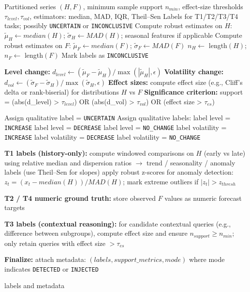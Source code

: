 \bigskip

\begin{algorithm}[H]
\caption{Rule-based Ground-Truth Labeling}
\label{alg:label_gen}
\begin{algorithmic}[1]
\REQUIRE Partitioned series $(H, F)$, minimum sample support $n_{min}$, effect-size thresholds $\tau_{level}, \tau_{vol}$, estimators: median, MAD, IQR, Theil--Sen
\ENSURE Labels for T1/T2/T3/T4 tasks; possibly \texttt{UNCERTAIN} or \texttt{INCONCLUSIVE}
\STATE Compute robust estimates on $H$: $\tilde{\mu}_H \leftarrow median(H)$; $\tilde{\sigma}_H \leftarrow MAD(H)$; seasonal features if applicable
\STATE Compute robust estimates on $F$: $\tilde{\mu}_F \leftarrow median(F)$; $\tilde{\sigma}_F \leftarrow MAD(F)$
\STATE $n_H \leftarrow$ length$(H)$; $n_F \leftarrow$ length$(F)$
    \STATE Mark labels as \texttt{INCONCLUSIVE}
    \RETURN
\ENDIF

\STATE \textbf{Level change:} $d_{level} \leftarrow (\tilde{\mu}_F - \tilde{\mu}_H)/\max(|\tilde{\mu}_H|, \epsilon)$
\STATE \textbf{Volatility change:} $d_{vol} \leftarrow (\tilde{\sigma}_F - \tilde{\sigma}_H)/\max(\tilde{\sigma}_H, \epsilon)$
\STATE \textbf{Effect sizes:} compute effect size (e.g., Cliff's delta or rank-biserial) for distributions $H$ vs $F$
\STATE \textbf{Significance criterion:} support = (abs(d_{level}) > $\tau_{level}$) OR (abs(d_{vol}) > $\tau_{vol}$) OR (effect size > $\tau_{es}$)

    \STATE Assign qualitative label = \texttt{UNCERTAIN}
\ELSE
    \STATE Assign qualitative labels:
     label level = \texttt{INCREASE}
     label level = \texttt{DECREASE}
    \ELSE label level = \texttt{NO\_CHANGE}
    \ENDIF
     label volatility = \texttt{INCREASE}
     label volatility = \texttt{DECREASE}
    \ELSE label volatility = \texttt{NO\_CHANGE}
    \ENDIF
\ENDIF

\STATE \textbf{T1 labels (history-only):}
\STATE compute windowed comparisons on $H$ (early vs late) using relative median and dispersion ratios $\to$ trend / seasonality / anomaly labels (use Theil--Sen for slopes)
\STATE apply robust z-scores for anomaly detection: $z_t = (x_t - median(H))/MAD(H)$; mark extreme outliers if $|z_t| > z_{thresh}$

\STATE \textbf{T2 / T4 numeric ground truth:} store observed $F$ values as numeric forecast targets

\STATE \textbf{T3 labels (contextual reasoning):}
\STATE for candidate contextual queries (e.g., difference between subgroups), compute effect size and ensure $n_{support} \ge n_{min}$; only retain queries with effect size $> \tau_{es}$

\STATE \textbf{Finalize:} attach metadata: $(labels, support\_metrics, mode)$ where mode indicates \texttt{DETECTED} or \texttt{INJECTED}

\RETURN labels and metadata
\end{algorithmic}
\end{algorithm}

